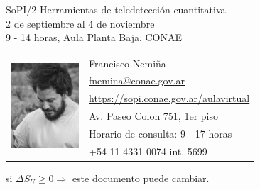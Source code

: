\documentclass[11pt]{article}
\begin{document}
\begin{center}
    {\LARGE SoPI/2 Herramientas de teledetección cuantitativa.}\\
    {\large 2 de septiembre al 4 de noviembre}\\
    {\large 9 - 14 horas, Aula Planta Baja, CONAE}\\
\end{center}
\vspace{10mm}

\begin{center}
\begin{tabular}{ l l }
  \multirow{6}{*}{\includegraphics[height=1.25in,width=1in]{pic_fran.png}} &
    \large Francisco Nemiña \\
  & \large \url{fnemina@conae.gov.ar} \\
  & \large \url{https://sopi.conae.gov.ar/aulavirtual} \\
  & \large Av. Paseo Colon 751, 1er piso\\
  & \large Horario de consulta: 9 - 17 horas\\
  & \large +54 11 4331 0074 int. 5699 \\
\end{tabular}
\end{center}
\vspace{5mm}
\begin{center} si $\Delta S_U \ge 0 \Rightarrow$ este documento puede cambiar. \\
\end{center}
\end{document}
